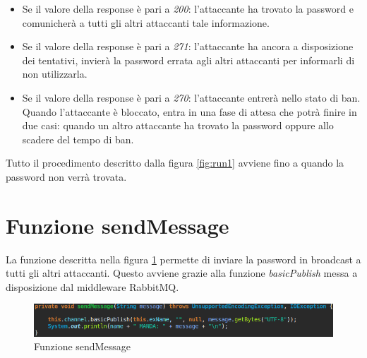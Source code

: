 \documentclass[a4paper,12pt,titlepage,oneside,openany]{book}
\begin{document}
\begin{itemize}
	\item Se il valore della response è pari a \textit{200}: l'attaccante ha trovato la password e comunicherà a tutti gli altri attaccanti tale informazione.
	\item Se il valore della response è pari a \textit{271}: l'attaccante ha ancora a disposizione dei tentativi, invierà la password errata agli altri attaccanti per informarli di non utilizzarla.
	\item Se il valore della response è pari a \textit{270}: l'attaccante entrerà nello stato di ban. Quando l'attaccante è bloccato, entra in una fase di attesa che potrà finire in due casi: quando un altro attaccante ha trovato la password oppure allo scadere del tempo di ban.
\end{itemize}
Tutto il procedimento descritto dalla figura \ref{fig:run1} avviene fino a quando la password non verrà trovata.
\section{Funzione sendMessage}
La funzione descritta nella figura \ref{fig:sendMessage} permette di inviare la password in broadcast a tutti gli altri attaccanti. Questo avviene grazie alla funzione \textit{basicPublish} messa a disposizione dal middleware RabbitMQ.
\begin{figure}[H]
	\centering
	\includegraphics[scale=0.5]{sendMessage.png}
	\caption{Funzione sendMessage}
	\label{fig:sendMessage}
\end{figure}
\end{document}
